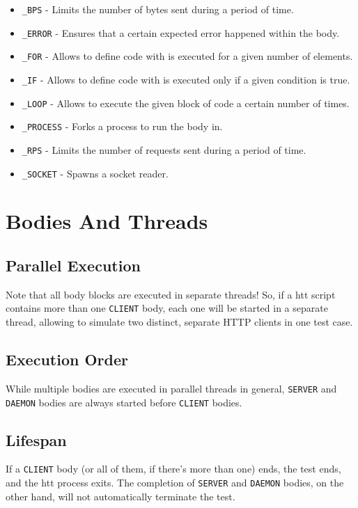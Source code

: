 \begin{itemize}
\item \texttt{\_BPS} - Limits the number of bytes sent during a period of time.
\item \texttt{\_ERROR} - Ensures that a certain expected error happened within the body.
\item \texttt{\_FOR} - Allows to define code with is executed for a given number of elements.
\item \texttt{\_IF} - Allows to define code with is executed only if a given condition is true.
\item \texttt{\_LOOP} - Allows to execute the given block of code a certain number of times.
\item \texttt{\_PROCESS} - Forks a process to run the body in.
\item \texttt{\_RPS} - Limits the number of requests sent during a period of time.
\item \texttt{\_SOCKET} - Spawns a socket reader.
\end{itemize}


\newpage 
\section{Bodies And Threads}

\subsection{Parallel Execution}
Note that all body blocks are executed in separate threads! So, if a htt 
script contains more than one \texttt{CLIENT} body, each one will be started in a 
separate thread, allowing to simulate two distinct, separate HTTP clients in 
one test case.

\subsection{Execution Order}
While multiple bodies are executed in parallel threads in general, \texttt{SERVER}
and \texttt{DAEMON} bodies are always started before \texttt{CLIENT} bodies.

\subsection{Lifespan}
If a \texttt{CLIENT} body (or all of them, if there's more than one) ends, 
the test ends, and the htt process exits. The completion of \texttt{SERVER} 
and \texttt{DAEMON} bodies, on the other hand, will not automatically terminate 
the test.

